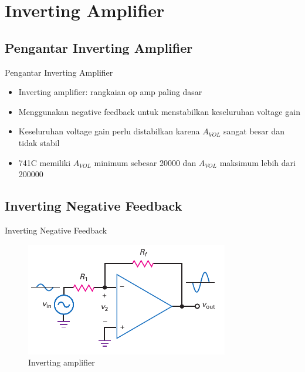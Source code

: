 \section{Inverting Amplifier}
\subsection{Pengantar Inverting Amplifier}
\begin{frame}{Pengantar Inverting Amplifier}
	\begin{itemize}
		\item Inverting amplifier: rangkaian op amp paling dasar
		\item Menggunakan negative feedback untuk menstabilkan keseluruhan voltage gain
		\item Keseluruhan voltage gain perlu distabilkan karena $ A_{VOL} $ sangat besar dan tidak stabil
		\item 741C memiliki $ A_{VOL} $ minimum sebesar 20000 dan $ A_{VOL} $ maksimum lebih dari 200000
	\end{itemize}
\end{frame}

\subsection{Inverting Negative Feedback}
\begin{frame}{Inverting Negative Feedback}
	\begin{figure}
		\centering
		\includegraphics[height=0.5\textheight]{gambar/fig-16.12}
		\caption{Inverting amplifier}
		\label{fig-16.12}
	\end{figure}
\end{frame}

